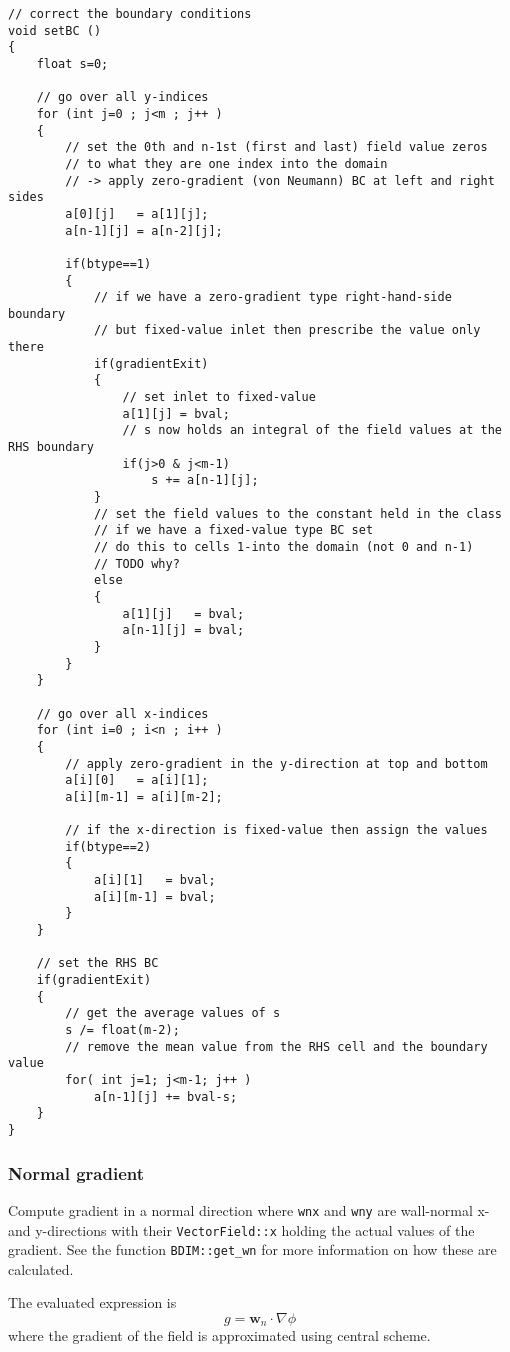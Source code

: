 \documentclass[notitlepage]{article}
\begin{document}
\begin{lstlisting}[style=myCpp]
// correct the boundary conditions
void setBC ()
{
	float s=0;
	
	// go over all y-indices
	for (int j=0 ; j<m ; j++ )
	{
		// set the 0th and n-1st (first and last) field value zeros
		// to what they are one index into the domain
		// -> apply zero-gradient (von Neumann) BC at left and right sides
		a[0][j]   = a[1][j];
		a[n-1][j] = a[n-2][j];
		
		if(btype==1)
		{
			// if we have a zero-gradient type right-hand-side boundary
			// but fixed-value inlet then prescribe the value only there
			if(gradientExit)
			{
				// set inlet to fixed-value
				a[1][j] = bval;
				// s now holds an integral of the field values at the RHS boundary
				if(j>0 & j<m-1)
					s += a[n-1][j];          
			}
			// set the field values to the constant held in the class
			// if we have a fixed-value type BC set
			// do this to cells 1-into the domain (not 0 and n-1)
			// TODO why?
			else
			{
				a[1][j]   = bval;  
				a[n-1][j] = bval;
			}
		}
	}
	
	// go over all x-indices
	for (int i=0 ; i<n ; i++ )
	{
		// apply zero-gradient in the y-direction at top and bottom
		a[i][0]   = a[i][1];
		a[i][m-1] = a[i][m-2];
		
		// if the x-direction is fixed-value then assign the values
		if(btype==2)
		{
			a[i][1]   = bval;  
			a[i][m-1] = bval;
		}
	}
	
	// set the RHS BC
	if(gradientExit)
	{
		// get the average values of s
		s /= float(m-2);
		// remove the mean value from the RHS cell and the boundary value
		for( int j=1; j<m-1; j++ )
			a[n-1][j] += bval-s;
	}
}
\end{lstlisting}

\subsubsection{Normal gradient}

Compute gradient in a normal direction where
\texttt{wnx} and \texttt{wny} are wall-normal x- and y-directions with their
\texttt{VectorField::x} holding the actual values of the gradient. See the function
\texttt{BDIM::get\_wn} for more information on how these are calculated.

The evaluated expression is
%
\begin{equation}
g = \mathbf{w}_n \cdot \nabla \phi
\end{equation}
%
where the gradient of the field is approximated using central scheme.
\end{document}
